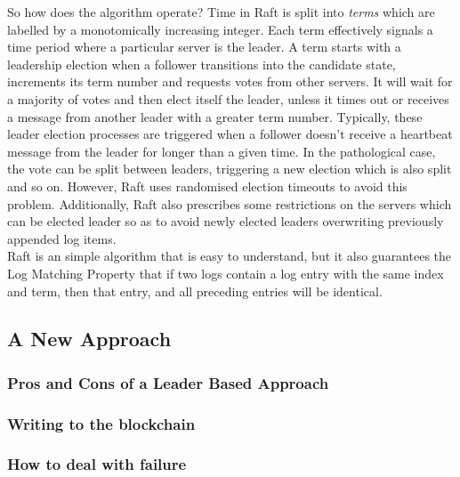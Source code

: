 \documentclass[12pt,a4paper,twoside,openright]{report}
\begin{document}
			So how does the algorithm operate? 
			Time in Raft is split into \textit{terms} which are labelled by a monotomically increasing integer. 
			Each term effectively signals a time period where a particular server is the leader. 
			A term starts with a leadership election when a follower transitions into the candidate state, increments its term number and requests votes from other servers. 
			It will wait for a majority of votes and then elect itself the leader, unless it times out or receives a message from another leader with a greater term number. 
			Typically, these leader election processes are triggered when a follower doesn't receive a heartbeat message from the leader for longer than a given time.
			In the pathological case, the vote can be split between leaders, triggering a new election which is also split and so on.
			However, Raft uses randomised election timeouts to avoid this problem.
			Additionally, Raft also prescribes some restrictions on the servers which can be elected leader so as to avoid newly elected leaders overwriting previously appended log items.\\
			
			Raft is an simple algorithm that is easy to understand, but it also guarantees the Log Matching Property that if two logs contain a log entry with the same index and term, then that entry, and all preceding entries will be identical.

		\subsection{A New Approach}
			\subsubsection*{Pros and Cons of a Leader Based Approach}
			\subsubsection*{Writing to the blockchain}
			\subsubsection*{How to deal with failure}
\end{document}
